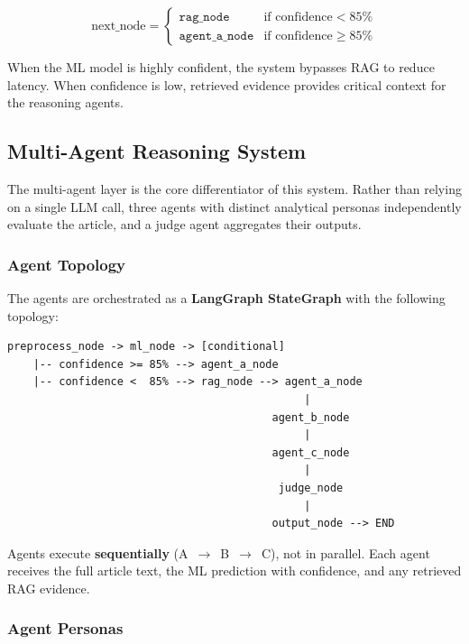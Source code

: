 \documentclass[12pt, a4paper]{article}
\begin{document}
\[
\text{next\_node} =
\begin{cases}
    \texttt{rag\_node}      & \text{if } \mathrm{confidence} < 85\% \\
    \texttt{agent\_a\_node} & \text{if } \mathrm{confidence} \geq 85\%
\end{cases}
\]

When the ML model is highly confident, the system bypasses RAG to reduce
latency. When confidence is low, retrieved evidence provides critical
context for the reasoning agents.


\subsection{Multi-Agent Reasoning System}

The multi-agent layer is the core differentiator of this system. Rather
than relying on a single LLM call, three agents with distinct analytical
personas independently evaluate the article, and a judge agent aggregates
their outputs.

\subsubsection{Agent Topology}

The agents are orchestrated as a \textbf{LangGraph StateGraph} with the
following topology:

\begin{lstlisting}[caption={LangGraph pipeline topology},label={lst:topology}]
preprocess_node -> ml_node -> [conditional]
    |-- confidence >= 85% --> agent_a_node
    |-- confidence <  85% --> rag_node --> agent_a_node
                                              |
                                         agent_b_node
                                              |
                                         agent_c_node
                                              |
                                          judge_node
                                              |
                                         output_node --> END
\end{lstlisting}

Agents execute \textbf{sequentially} (A~$\to$~B~$\to$~C), not in parallel.
Each agent receives the full article text, the ML prediction with
confidence, and any retrieved RAG evidence.

\subsubsection{Agent Personas}
\end{document}
